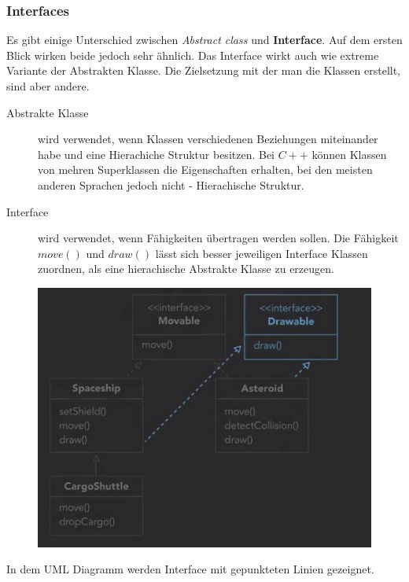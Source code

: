 \subsubsection{Interfaces}
Es gibt einige Unterschied zwischen \textit{Abstract class} und \textbf{Interface}. Auf dem ersten Blick wirken beide jedoch sehr ähnlich. Das Interface wirkt auch wie extreme Variante der Abstrakten Klasse. Die Zielsetzung mit der man die Klassen erstellt, sind aber andere. 
\begin{description}
\item[Abstrakte Klasse] wird verwendet, wenn Klassen verschiedenen Beziehungen miteinander habe und eine Hierachiche Struktur besitzen. Bei $C++$ können Klassen von mehren Superklassen die Eigenschaften erhalten, bei den meisten anderen Sprachen jedoch nicht - Hierachische Struktur. 
\item[Interface] wird verwendet, wenn Fähigkeiten übertragen werden sollen. Die Fähigkeit $move()$ und $draw()$ lässt sich besser jeweiligen Interface Klassen zuordnen, als eine hierachische Abstrakte Klasse zu erzeugen. 
\end{description}
\begin{figure}[H]
\centering
\includegraphics[scale = 0.3]{attachment/chapter_2/Scc013}
\caption{}
\label{fig:Scc013}
\end{figure}
In dem UML Diagramm werden Interface mit gepunkteten Linien gezeignet.\\

